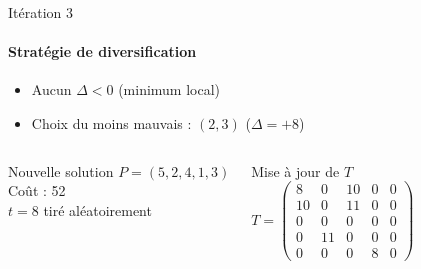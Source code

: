\documentclass{beamer}
\begin{document}
\begin{frame}{Itération 3 }
    \framesubtitle{Stratégie de diversification}


    \begin{itemize}
        \item Aucun \( \Delta < 0 \) (minimum local)
        \item Choix du moins mauvais : \( (2,3) \) (\( \Delta = +8 \))
    \end{itemize}

    \begin{columns}
        \begin{alertblock}{Nouvelle solution}
            \( P = (5, 2, 4, 1, 3) \) \\
            Coût : 52 \\
            \( t = 8 \) tiré aléatoirement
        \end{alertblock}

        \begin{exampleblock}{Mise à jour de \( T \)}
            \[
                T = \begin{pmatrix}
                    8  & 0  & 10 & 0 & 0 \\
                    10 & 0  & 11 & 0 & 0 \\
                    0  & 0  & 0  & 0 & 0 \\
                    0  & 11 & 0  & 0 & 0 \\
                    0  & 0  & 0  & 8 & 0
                \end{pmatrix}
            \]
        \end{exampleblock}
    \end{columns}
\end{frame}
\end{document}

